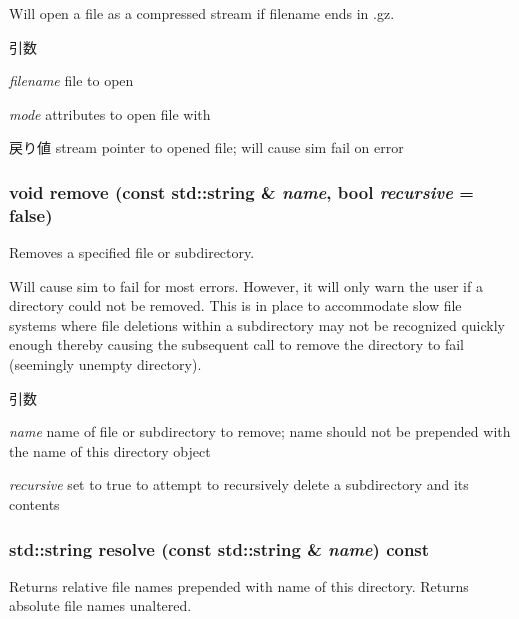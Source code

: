 Will open a file as a compressed stream if filename ends in .gz.


\begin{DoxyParams}{引数}
\item[{\em filename}]file to open \item[{\em mode}]attributes to open file with \end{DoxyParams}
\begin{DoxyReturn}{戻り値}
stream pointer to opened file; will cause sim fail on error 
\end{DoxyReturn}
\hypertarget{classOutputDirectory_a6eb2aac9c800b6ab1640ec5d8e0bdec1}{
\subsubsection[{remove}]{\setlength{\rightskip}{0pt plus 5cm}void remove (const std::string \& {\em name}, \/  bool {\em recursive} = {\ttfamily false})}}
\label{classOutputDirectory_a6eb2aac9c800b6ab1640ec5d8e0bdec1}
Removes a specified file or subdirectory.

Will cause sim to fail for most errors. However, it will only warn the user if a directory could not be removed. This is in place to accommodate slow file systems where file deletions within a subdirectory may not be recognized quickly enough thereby causing the subsequent call to remove the directory to fail (seemingly unempty directory).


\begin{DoxyParams}{引数}
\item[{\em name}]name of file or subdirectory to remove; name should not be prepended with the name of this directory object \item[{\em recursive}]set to true to attempt to recursively delete a subdirectory and its contents \end{DoxyParams}
\hypertarget{classOutputDirectory_abfb043ef04e73fe88fb002c53447a348}{
\subsubsection[{resolve}]{\setlength{\rightskip}{0pt plus 5cm}std::string resolve (const std::string \& {\em name}) const}}
\label{classOutputDirectory_abfb043ef04e73fe88fb002c53447a348}
Returns relative file names prepended with name of this directory. Returns absolute file names unaltered.


